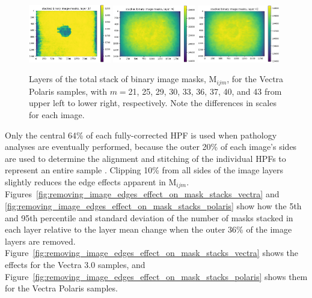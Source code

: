 \documentclass[letterpaper,11pt]{article}
\newcommand{\reffig}[1]{Figure~\ref{#1}}
\newcommand{\Mu}{\mathrm{M}}
\begin{document}
\begin{figure}[!ht]
\includegraphics[width=0.32\textwidth]{images/measuring_flatfield_corrections/mask_stack_layers_polaris/mask_stack_layer_37}
\includegraphics[width=0.32\textwidth]{images/measuring_flatfield_corrections/mask_stack_layers_polaris/mask_stack_layer_40}
\includegraphics[width=0.32\textwidth]{images/measuring_flatfield_corrections/mask_stack_layers_polaris/mask_stack_layer_43}
\caption{\footnotesize Layers of the total stack of binary image masks, $\Mu_{ijm}$, for the Vectra Polaris samples, with $m=$21, 25, 29, 30, 33, 36, 37, 40, and 43 from upper left to lower right, respectively. Note the differences in scales for each image.}
\label{fig:mask_stack_layers_polaris_2}
\end{figure}

\clearpage

Only the central 64\% of each fully-corrected HPF is used when pathology analyses are eventually performed, because the outer 20\% of each image's sides are used to determine the alignment and stitching of the individual HPFs to represent an entire sample \cite{Heshy}. Clipping 10\% from all sides of the image layers slightly reduces the edge effects apparent in $\Mu_{ijm}$. Figures~\ref{fig:removing_image_edges_effect_on_mask_stacks_vectra} and \ref{fig:removing_image_edges_effect_on_mask_stacks_polaris} show how the 5th and 95th percentile and standard deviation of the number of masks stacked in each layer relative to the layer mean change when the outer 36\% of the image layers are removed. \reffig{fig:removing_image_edges_effect_on_mask_stacks_vectra} shows the effects for the Vectra 3.0 samples, and \reffig{fig:removing_image_edges_effect_on_mask_stacks_polaris} shows them for the Vectra Polaris samples.
\end{document}
